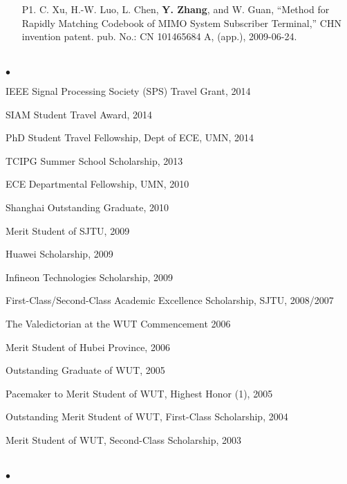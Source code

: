 \documentclass[margin,line]{res}
\newenvironment{list2}{
  \begin{list}{$\bullet$}{%
      \setlength{\itemsep}{0in}
      \setlength{\parsep}{0in} \setlength{\parskip}{0in}
      \setlength{\topsep}{0in} \setlength{\partopsep}{0in}
      \setlength{\leftmargin}{0.10in}}}{\end{list}}
\begin{document}
\begin{resume}
\begin{enumerate}
\item[P1.] C. Xu, H.-W. Luo, L. Chen, \textbf{Y. Zhang}, and W. Guan,
``Method for Rapidly Matching Codebook of MIMO System Subscriber Terminal,'' CHN invention patent.
pub. No.: CN 101465684 A, (app.), 2009-06-24.


\end{enumerate}

\vspace{.3cm}



\section{}
\begin{list2}
\item IEEE Signal Processing Society (SPS) Travel Grant, 2014
\item SIAM Student Travel Award, 2014
\item PhD Student Travel Fellowship, Dept of ECE, UMN, 2014	
\item	TCIPG Summer School Scholarship, 2013
\item	ECE Departmental Fellowship, UMN, 2010
\item	Shanghai Outstanding Graduate, 2010
\item	Merit Student of SJTU, 2009
\item	Huawei Scholarship, 2009
\item	Infineon Technologies Scholarship, 2009
\item	First-Class/Second-Class Academic Excellence Scholarship, SJTU, 2008/2007
\item	The Valedictorian at the WUT Commencement 2006
\item	Merit Student of Hubei Province, 2006
\item	Outstanding Graduate of WUT, 2005
\item	Pacemaker to Merit Student of WUT, Highest Honor (1\textperthousand), 2005
\item	Outstanding Merit Student of WUT, First-Class Scholarship, 2004
\item	Merit Student of WUT, Second-Class Scholarship, 2003
\end{list2}

\vspace{.3cm}




\section{}
\begin{list2}



\end{list2}
\end{resume}
\end{document}

